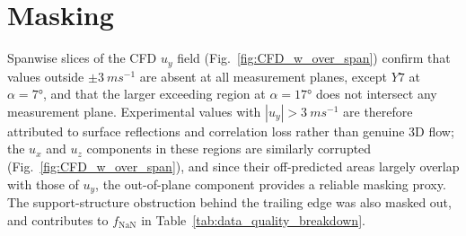 \documentclass[wes, manuscript]{copernicus}
\begin{document}
\section{Masking}\label{sec:appendix_masking}
%
Spanwise slices of the CFD $u_{y}$ field (Fig.~\ref{fig:CFD_w_over_span}) confirm that values outside $\pm 3~\unit{m s^{-1}}$ are absent at all measurement planes, except $Y7$ at $\alpha = 7\unit{\degree}$, and that the larger exceeding region at $\alpha = 17\unit{\degree}$ does not intersect any measurement plane. Experimental values with $|u_{y}| > 3~\unit{m s^{-1}}$ are therefore attributed to surface reflections and correlation loss rather than genuine 3D flow; the $u_{x}$ and $u_{z}$ components in these regions are similarly corrupted (Fig.~\ref{fig:CFD_w_over_span}), and since their off-predicted areas largely overlap with those of $u_{y}$, the out-of-plane component provides a reliable masking proxy. The support-structure obstruction behind the trailing edge was also masked out, and contributes to $f_\mathrm{NaN}$ in Table~\ref{tab:data_quality_breakdown}.
\end{document}
